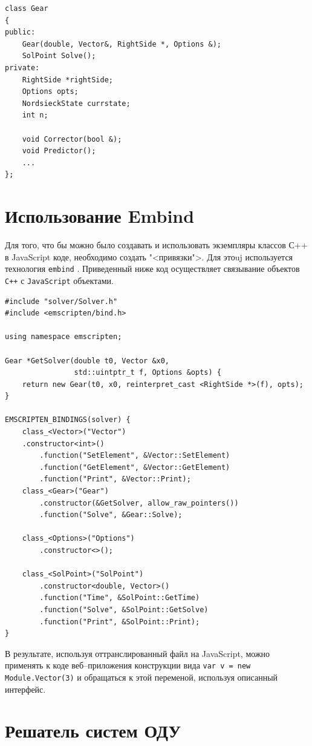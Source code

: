 \documentclass[oneside,final,14pt]{extreport}
\begin{document}
\begin{verbatim}
class Gear
{
public:
    Gear(double, Vector&, RightSide *, Options &);
    SolPoint Solve();
private:
    RightSide *rightSide;
    Options opts;
    NordsieckState currstate;
    int n;
    
    void Corrector(bool &);
    void Predictor();    
    ...
};
\end{verbatim}

\section{Использование Embind}
Для того, что бы можно было создавать и использовать экземпляры классов С++ в JavaScript коде, необходимо создать "<привязки">. Для этоuj используется технология \texttt{embind} \cite{emscripten}. Приведенный ниже код осуществляет связывание объектов \texttt{С++} с \texttt{JavaScript} объектами.
\begin{verbatim}
#include "solver/Solver.h"
#include <emscripten/bind.h>

using namespace emscripten;

Gear *GetSolver(double t0, Vector &x0,
                std::uintptr_t f, Options &opts) {
    return new Gear(t0, x0, reinterpret_cast <RightSide *>(f), opts);
}

EMSCRIPTEN_BINDINGS(solver) {
    class_<Vector>("Vector")
    .constructor<int>()
        .function("SetElement", &Vector::SetElement)
        .function("GetElement", &Vector::GetElement)
        .function("Print", &Vector::Print);
    class_<Gear>("Gear")
        .constructor(&GetSolver, allow_raw_pointers())
        .function("Solve", &Gear::Solve);

    class_<Options>("Options")
        .constructor<>();
        		
    class_<SolPoint>("SolPoint")
        .constructor<double, Vector>()
        .function("Time", &SolPoint::GetTime)
        .function("Solve", &SolPoint::GetSolve)
        .function("Print", &SolPoint::Print);
}
\end{verbatim}
В результате, используя оттранслированный файл на JavaScript, можно применять к коде веб--приложения конструкции вида \texttt{var v = new Module.Vector(3)} и обращаться к этой переменой, используя описанный интерфейс.

\section{Решатель систем ОДУ}
\end{document}
